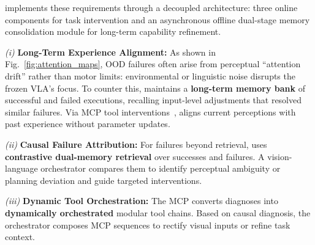 

{\sys} implements these requirements through a decoupled architecture: three online components for task intervention and an asynchronous offline dual-stage memory consolidation module for long-term capability refinement.


\emph{(i)} \textbf{Long-Term Experience Alignment:}
As shown in Fig.~\ref{fig:attention_maps}, OOD failures often arise from perceptual ``attention drift'' 
rather than motor limits: environmental or linguistic noise disrupts the frozen VLA's focus.
To counter this, {\sys} maintains a \textbf{long-term memory bank} of successful and failed executions, 
recalling input-level adjustments that resolved similar failures.
Via MCP tool interventions~\cite{MCP}, {\sys} aligns current perceptions with past experience without parameter updates.

\emph{(ii)} \textbf{Causal Failure Attribution:}
For failures beyond retrieval, 
{\sys} uses \textbf{contrastive dual-memory retrieval} over successes and failures.
A {\color{black}vision-language orchestrator} compares them to identify perceptual ambiguity or planning deviation and guide targeted interventions.


\emph{(iii)} \textbf{Dynamic Tool Orchestration:}
The MCP converts diagnoses into \textbf{dynamically orchestrated} modular tool chains.
Based on causal diagnosis, the {\color{black}orchestrator} composes MCP sequences to rectify visual inputs or refine task context.

